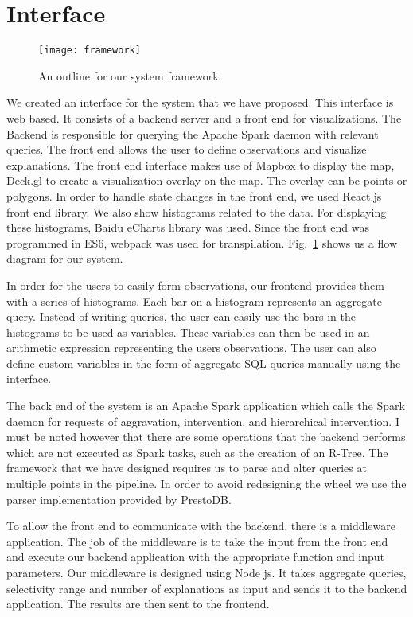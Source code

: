 \section{Interface}

\begin{figure}[h]
\texttt{[image: framework]}
\caption{An outline for our system framework}
\label{fig:framework}
\end{figure}

We created an interface for the system that we have proposed. This interface is web based. It consists of a backend server and a front end for visualizations. The Backend is responsible for querying the Apache Spark daemon with relevant queries. The front end allows the user to define observations and visualize explanations. The front end interface makes use of Mapbox to display the map, Deck.gl to create a visualization overlay on the map. The overlay can be points or polygons. In order to handle state changes in the front end, we used React.js front end library. We also show histograms related to the data. For displaying these histograms, Baidu eCharts library was used. Since the front end was programmed in ES6, webpack was used for transpilation\citep{webpack}. Fig.~\ref{fig:framework} shows us a flow diagram for our system.

In order for the users to easily form observations, our frontend provides them with a series of histograms. Each bar on a histogram represents an aggregate query. Instead of writing queries, the user can easily use the bars in the histograms to be used as variables. These variables can then be used in an arithmetic expression representing the users observations. The user can also define custom variables in the form of aggregate SQL queries manually using the interface.

The back end of the system is an Apache Spark application which calls the Spark daemon for requests of aggravation, intervention, and hierarchical intervention. I must be noted however that there are some operations that the backend performs which are not executed as Spark tasks, such as the creation of an R-Tree. The framework that we have designed requires us to parse and alter queries at multiple points in the pipeline. In order to avoid redesigning the wheel we use the parser implementation provided by PrestoDB\citep{prestodb}.

To allow the front end to communicate with the backend, there is a middleware application. The job of the middleware is to take the input from the front end and execute our backend application with the appropriate function and input parameters. Our middleware is designed using Node js\citep{tilkov2010node,cantelon2017node}. It takes aggregate queries, selectivity range and number of explanations as input and sends it to the backend application. The results are then sent to the frontend.

